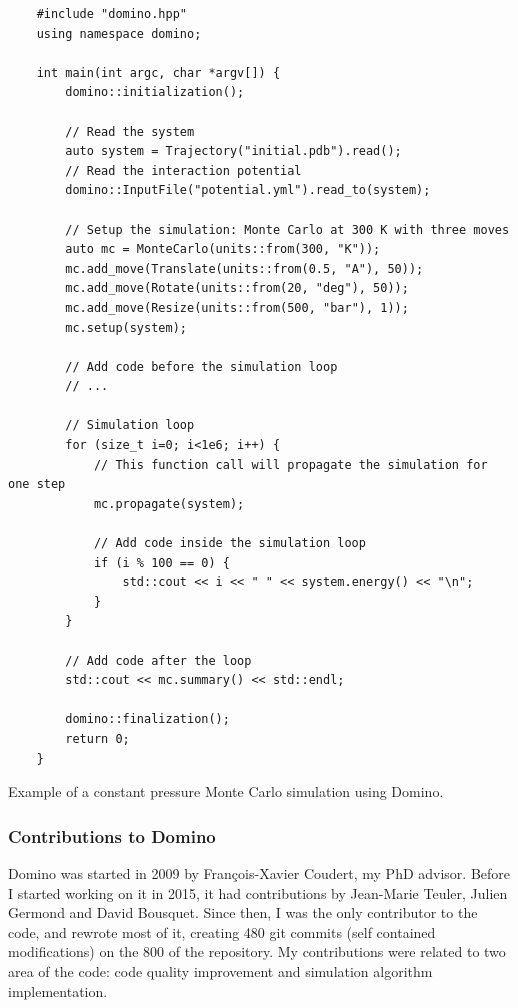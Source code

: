 \documentclass[thesis]{subfiles}
\begin{document}
\begin{listing}[ht]
    \begin{verbatim}
    #include "domino.hpp"
    using namespace domino;

    int main(int argc, char *argv[]) {
        domino::initialization();

        // Read the system
        auto system = Trajectory("initial.pdb").read();
        // Read the interaction potential
        domino::InputFile("potential.yml").read_to(system);

        // Setup the simulation: Monte Carlo at 300 K with three moves
        auto mc = MonteCarlo(units::from(300, "K"));
        mc.add_move(Translate(units::from(0.5, "A"), 50));
        mc.add_move(Rotate(units::from(20, "deg"), 50));
        mc.add_move(Resize(units::from(500, "bar"), 1));
        mc.setup(system);

        // Add code before the simulation loop
        // ...

        // Simulation loop
        for (size_t i=0; i<1e6; i++) {
            // This function call will propagate the simulation for one step
            mc.propagate(system);

            // Add code inside the simulation loop
            if (i % 100 == 0) {
                std::cout << i << " " << system.energy() << "\n";
            }
        }

        // Add code after the loop
        std::cout << mc.summary() << std::endl;

        domino::finalization();
        return 0;
    }
    \end{verbatim}
    \caption{Example of a constant pressure Monte Carlo simulation using Domino.}
    \label{code:simulation-example}
\end{listing}

\newpage
\subsubsection{Contributions to Domino}

Domino was started in 2009 by François-Xavier Coudert, my PhD advisor. Before I
started working on it in 2015, it had contributions by Jean-Marie Teuler, Julien
Germond and David Bousquet. Since then, I was the only contributor to the code,
and rewrote most of it, creating 480 git commits (self contained modifications)
on the 800 of the repository.  My contributions were related to two area of the
code: code quality improvement and simulation algorithm implementation.
\end{document}
